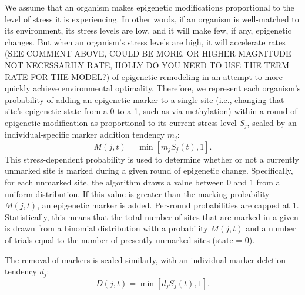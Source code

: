 \documentclass{article}
\begin{document}
We assume that an organism makes epigenetic modifications proportional to the level of stress it is experiencing. In other words, if an organism is well-matched to its environment, its stress levels are low, and it will make few, if any, epigenetic changes. But when an organism's stress levels are high, it will accelerate rates (SEE COMMENT ABOVE, COULD BE MORE, OR HIGHER MAGNITUDE NOT NECESSARILY RATE, HOLLY DO YOU NEED TO USE THE TERM RATE FOR THE MODEL?) of epigenetic remodeling in an attempt to more quickly achieve environmental optimality. Therefore, we represent each organism's probability of adding an epigenetic marker to a single site (i.e., changing that site's epigenetic state from a 0 to a 1, such as via methylation) within a round of epigenetic modification as proportional to its current stress level $S_j$, scaled by an individual-specific marker addition tendency $m_j$:
\begin{equation}
    M(j,t) = \min\left[m_jS_j(t),1\right].
\end{equation}
This stress-dependent probability is used to determine whether or not a currently unmarked site is marked during a given round of epigenetic change. Specifically, for each unmarked site, the algorithm draws a value between 0 and 1 from a uniform distribution. If this value is greater than the marking probability $M(j,t)$, an epigenetic marker is added. Per-round probabilities are capped at 1. Statistically, this means that the total number of sites that are marked in a given is drawn from a binomial distribution with a probability $M(j,t)$ and a number of trials equal to the number of presently unmarked sites (state = 0). 

The removal of markers is scaled similarly, with an individual marker deletion tendency $d_j$:
\begin{equation}
    D(j,t) = \min \left[d_jS_j(t),1 \right].
\end{equation}
\end{document}
